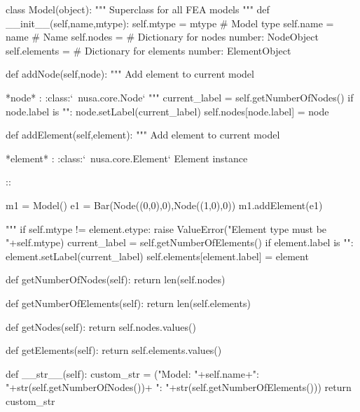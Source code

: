 \begin{python}
class Model(object):
    """
    Superclass for all FEA models
    """
    def __init__(self,name,mtype):
        self.mtype = mtype # Model type
        self.name = name # Name 
        self.nodes = {} # Dictionary for nodes {number: NodeObject}
        self.elements = {} # Dictionary for elements {number: ElementObject}
        
    def addNode(self,node):
        """
        Add element to current model
        
        *node* :   :class:`~nusa.core.Node`
        """
        current_label = self.getNumberOfNodes()
        if node.label is "":
            node.setLabel(current_label)
        self.nodes[node.label] = node
        
    def addElement(self,element):
        """
        Add element to current model
        
        *element* :  :class:`~nusa.core.Element`
            Element instance 
        
        ::
        
            m1 = Model()
            e1 = Bar(Node((0,0),0),Node((1,0),0))
            m1.addElement(e1)
        
        """
        if self.mtype != element.etype:
            raise ValueError("Element type must be "+self.mtype)
        current_label = self.getNumberOfElements()
        if element.label is "":
            element.setLabel(current_label)
        self.elements[element.label] = element

    def getNumberOfNodes(self):
        return len(self.nodes)
        
    def getNumberOfElements(self):
        return len(self.elements)
        
    def getNodes(self):
        return self.nodes.values()
        
    def getElements(self):
        return self.elements.values()
    
    def __str__(self):
        custom_str = ("Model: "+self.name+"\nNodes: "+str(self.getNumberOfNodes())+
        "\nElements: "+str(self.getNumberOfElements()))
        return custom_str
\end{python}